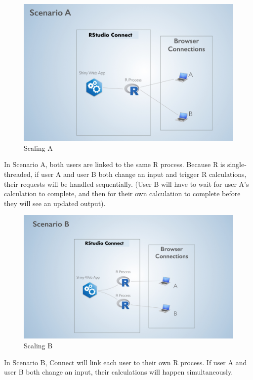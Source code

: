 \documentclass[]{book}
\theoremstyle{definition}
\theoremstyle{definition}
\theoremstyle{definition}
\theoremstyle{remark}
\begin{document}
\begin{figure}
\centering
\includegraphics{imgs/scaling/scaling-a.png}
\caption{Scaling A}
\end{figure}

In Scenario A, both users are linked to the same R process. Because R is
single-threaded, if user A and user B both change an input and trigger R
calculations, their requests will be handled sequentially. (User B will
have to wait for user A's calculation to complete, and then for their
own calculation to complete before they will see an updated output).

\begin{figure}
\centering
\includegraphics{imgs/scaling/scaling-b.png}
\caption{Scaling B}
\end{figure}

In Scenario B, Connect will link each user to their own R process. If
user A and user B both change an input, their calculations will happen
simultaneously.
\end{document}
